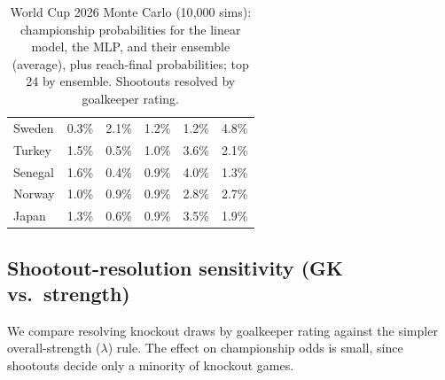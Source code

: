 \documentclass{article}
\begin{document}
\begin{table}[h!]
{\begin{tabular}{@{}lrrrrr@{}}
Sweden & 0.3\% & 2.1\% & 1.2\% & 1.2\% & 4.8\% \\
Turkey & 1.5\% & 0.5\% & 1.0\% & 3.6\% & 2.1\% \\
Senegal & 1.6\% & 0.4\% & 0.9\% & 4.0\% & 1.3\% \\
Norway & 1.0\% & 0.9\% & 0.9\% & 2.8\% & 2.7\% \\
Japan & 1.3\% & 0.6\% & 0.9\% & 3.5\% & 1.9\% \\
\bottomrule
\end{tabular}}
\caption{World Cup 2026 Monte Carlo (10{,}000 sims): championship probabilities for the linear model, the MLP, and their ensemble (average), plus reach-final probabilities; top 24 by ensemble. Shootouts resolved by goalkeeper rating.}
\end{table}

\subsection*{Shootout-resolution sensitivity (GK vs.\ strength)}
We compare resolving knockout draws by goalkeeper rating against the simpler overall-strength ($\lambda$) rule. The effect on championship odds is small, since shootouts decide only a minority of knockout games.
\begin{table}[h!]
\centering
{}
\caption{Shootout-resolution sensitivity: championship probability when knockout draws are decided by goalkeeper rating (GK) vs.\ overall strength ($\lambda$). $\Delta$ in percentage points.}
\end{table}
\end{document}
